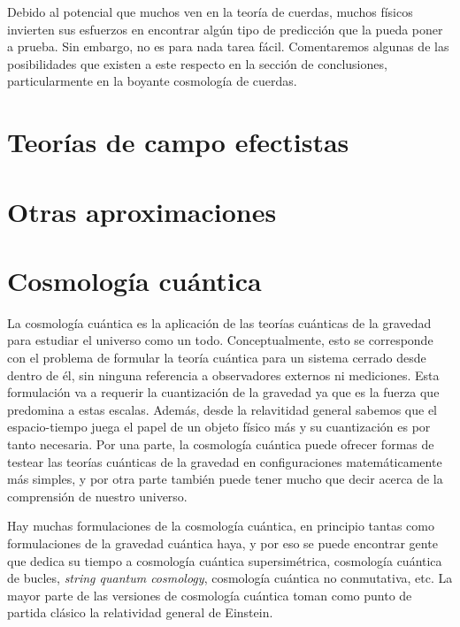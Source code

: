\documentclass[11pt,a4paper,titlepage]{article}
\begin{document}
Debido al potencial que muchos ven en la teoría de cuerdas, muchos físicos invierten sus esfuerzos en encontrar algún tipo de predicción que la pueda poner a prueba. Sin embargo, no es para nada tarea fácil. Comentaremos algunas de las posibilidades que existen a este respecto en la sección de conclusiones, particularmente en la boyante cosmología de cuerdas.

%
%
%
%
\newpage
\section{Teorías de campo efectistas} %

%
%
%
%
\newpage
\section{Otras aproximaciones} %


\newpage
\section{Cosmología cuántica}

La cosmología cuántica es la aplicación de las teorías cuánticas de la gravedad para estudiar el universo como un todo. Conceptualmente, esto se corresponde con el problema de formular la teoría cuántica para un sistema cerrado desde dentro de él, sin ninguna referencia a observadores externos ni mediciones. Esta formulación va a requerir la cuantización de la gravedad ya que es la fuerza que predomina a estas escalas. Además, desde la relavitidad general sabemos que el espacio-tiempo juega el papel de un objeto físico más y su cuantización es por tanto necesaria. Por una parte, la cosmología cuántica puede ofrecer formas de testear las teorías cuánticas de la gravedad en configuraciones matemáticamente más simples, y por otra parte también puede tener mucho que decir acerca de la comprensión de nuestro universo.

Hay muchas formulaciones de la cosmología cuántica, en principio tantas como formulaciones de la gravedad cuántica haya, y por eso se puede encontrar gente que dedica su tiempo a cosmología cuántica supersimétrica, cosmología cuántica de bucles, \emph{string quantum cosmology}, cosmología cuántica no conmutativa, etc. La mayor parte de las versiones de cosmología cuántica toman como punto de partida clásico la relatividad general de Einstein.
\end{document}
